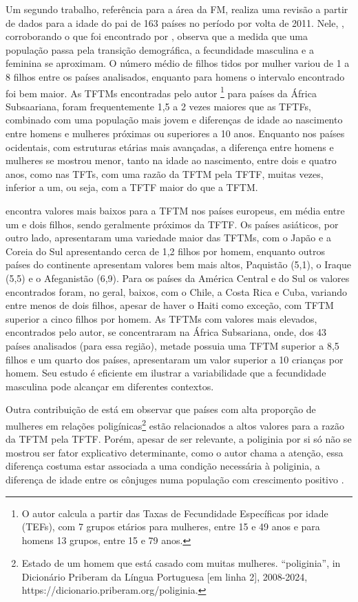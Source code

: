  Um segundo trabalho, referência para a área da FM, realiza uma revisão a partir de dados para a idade do pai de 163 países no período por volta de 2011. Nele, , corroborando o que foi encontrado por , observa que a medida que uma população passa pela transição demográfica, a fecundidade masculina e a feminina se aproximam. O número médio de filhos tidos por mulher variou de 1 a 8 filhos entre os países analisados, enquanto para homens o intervalo encontrado foi bem maior. As TFTMs encontradas pelo autor \footnote{O autor calcula a partir das Taxas de Fecundidade Específicas por idade (TEFs), com 7 grupos etários para mulheres, entre 15 e 49 anos e para homens 13 grupos, entre  15 e 79 anos. } para países da África Subsaariana, foram frequentemente 1,5 a 2 vezes maiores que as TFTFs, combinado com uma população mais jovem e diferenças de idade ao nascimento entre homens e mulheres próximas ou superiores a 10 anos. Enquanto nos países ocidentais, com estruturas etárias mais avançadas, a diferença entre homens e mulheres se mostrou menor, tanto na idade ao nascimento, entre dois e quatro anos, como nas TFTs, com uma razão da TFTM pela TFTF, muitas vezes, inferior a um, ou seja, com a TFTF maior do que a TFTM.

 encontra valores mais baixos para a TFTM  nos países europeus, em média entre um e dois filhos, sendo geralmente próximos da TFTF. Os países asiáticos, por outro lado, apresentaram uma variedade maior das TFTMs, com o Japão e a Coreia do Sul apresentando cerca de 1,2 filhos por homem, enquanto outros países do continente apresentam valores bem mais altos, Paquistão (5,1), o Iraque (5,5) e o Afeganistão (6,9). Para os países da América Central e do Sul os valores encontrados foram, no geral, baixos, com o Chile, a Costa Rica e Cuba, variando entre menos de dois filhos, apesar de haver o Haiti como exceção, com TFTM superior a cinco filhos por homem. As TFTMs com valores mais elevados, encontrados pelo autor, se concentraram na África Subsariana, onde, dos 43 países analisados (para essa região), metade possuia uma TFTM superior a 8,5 filhos e um quarto dos países, apresentaram um valor superior a 10 crianças por homem. Seu estudo é eficiente em ilustrar a variabilidade que a fecundidade masculina pode alcançar em diferentes contextos.

Outra contribuição de  está em observar que países com alta proporção de mulheres em relações poligínicas\footnote{Estado de um homem que está casado com muitas mulheres. “poliginia”, in Dicionário Priberam da Língua Portuguesa [em linha 2], 2008-2024, https://dicionario.priberam.org/poliginia.} estão relacionados a altos valores para a razão da TFTM pela TFTF. Porém, apesar de ser relevante, a poliginia por si só não se mostrou ser fator explicativo determinante, como o autor chama a atenção, essa diferença costuma estar associada a uma condição necessária à poliginia, a diferença de idade entre os cônjuges numa população com crescimento positivo .

